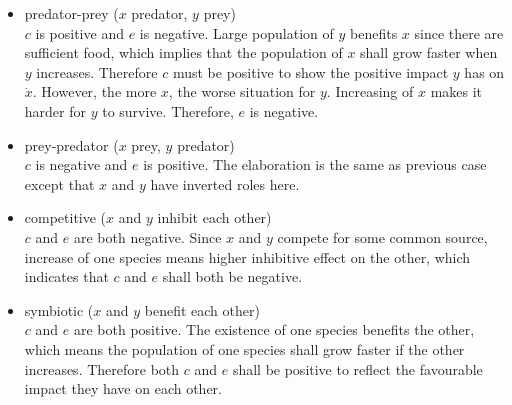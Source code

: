 \begin{itemize}
  \item predator-prey ($x$ predator, $y$ prey)\\
  $c$ is positive and $e$ is negative. Large population of $y$ benefits $x$ since there are sufficient food, which implies that the population of $x$ shall grow faster when $y$ increases. Therefore $c$ must be positive to show the positive impact $y$ has on $\dot{x}$. However, the more $x$, the worse situation for $y$. Increasing of $x$ makes it harder for $y$ to survive. Therefore, $e$ is negative.
  \item prey-predator ($x$ prey, $y$ predator)\\
  $c$ is negative and $e$ is positive. The elaboration is the same as previous case except that $x$ and $y$ have inverted roles here.
  \item competitive ($x$ and $y$ inhibit each other)\\
  $c$ and $e$ are both negative. Since $x$ and $y$ compete for some common source, increase of one species means higher inhibitive effect on the other, which indicates that $c$ and $e$ shall both be negative.
  \item symbiotic ($x$ and $y$ benefit each other)\\
  $c$ and $e$ are both positive. The existence of one species benefits the other, which means the population of one species shall grow faster if the other increases. Therefore both $c$ and $e$ shall be positive to reflect the favourable impact they have on each other.
\end{itemize}